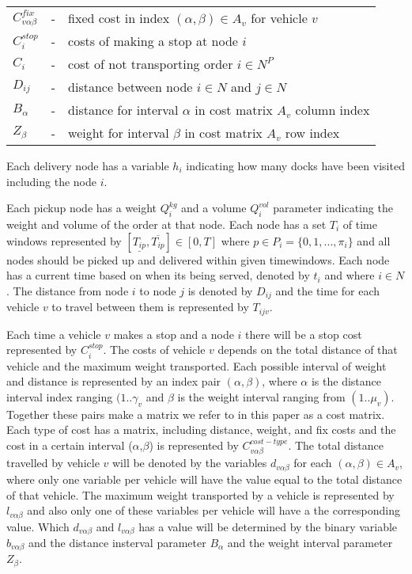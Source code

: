 \documentclass[../main.tex]{subfiles}
\begin{document}
\begin{tabular}{l c l }
    $C^{fix}_{v\alpha\beta} $	&-& fixed cost in index $(\alpha, \beta) \in A_v$ for vehicle $v$	\\
    $C^{stop}_i             $   &-& costs of making a stop at node $i$ 	                        \\
    $C_i                    $   &-& cost of not transporting order $i\in N^P$                   \\
    $D_{ij}	            $   &-& distance between node $i\in N$ and  $j\in N$		\\
    $B_\alpha               $   &-& distance for interval $\alpha$ in cost matrix $A_v$ column index\\
    $Z_\beta                $   &-& weight for interval $\beta$ in cost matrix $A_v$ row index    \\ 
\end{tabular}
\linebreak
\linebreak
\par
Each delivery node has a variable $h_{i}$ indicating how many docks have been visited including the node $i$. \par 
Each pickup node has a weight $Q_i^{kg}$ and a volume $Q_i^{vol}$ parameter indicating the weight and volume of the order at that node.
Each node has a set $T_{i}$ of time windows represented by $[ \underline{T_{ip}},  \overline{T_{ip}} ] \in [0,T]$ where $p \in P_i=\{0,1,...,\pi_i\}$ and all nodes should be picked up and delivered within given timewindows.
Each node has a current time based on when its being served, denoted by $t_{i}$ and where $i \in N$. 
The distance from node $i$ to node $j$ is denoted by $D_{ij}$ and the time for each vehicle $v$ to travel between them is represented by $T_{ijv}$. \par 
Each time a vehicle $v$ makes a stop and a node $i$ there will be a stop cost represented by $C_i^{stop}$. 
The costs of vehicle $v$ depends on the total distance of that vehicle and the maximum weight transported. 
Each possible interval of weight and distance is represented by an index pair $(\alpha,\beta)$, where $\alpha$ is the distance interval index ranging $(1..\gamma_v$ and $\beta$ is the weight interval ranging from $(1..\mu_v)$. 
Together these pairs make a matrix we refer to in this paper as a cost matrix. 
Each type of cost has a matrix, including distance, weight, and fix costs and the cost in a certain interval ($\alpha$,$\beta$) is represented by $C_{v\alpha\beta}^{cost-type}$. 
The total distance travelled by vehicle $v$ will be denoted by the variables $d_{v\alpha\beta}$ for each $(\alpha,\beta)\in A_v$, where only one variable per vehicle will have the value equal to the total distance of that vehicle. 
The maximum weight transported by a vehicle is represented by $l_{v\alpha\beta}$ and also only one of these variables per vehicle will have a the corresponding value.
Which $d_{v\alpha\beta}$ and $l_{v\alpha\beta}$ has a value will be determined by the binary variable $b_{v\alpha\beta}$ and the distance insterval parameter $B_\alpha$ and the weight interval parameter $Z_\beta$.  
\linebreak
\end{document}
